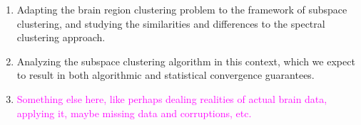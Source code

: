 \documentclass[times,11pt]{article} %
\newcommand{\laura}{\textcolor{magenta}}
\begin{document}
\begin{enumerate}
\item Adapting the brain region clustering problem to the framework of subspace clustering, and studying the similarities and differences to the spectral clustering approach.
\item Analyzing the subspace clustering algorithm in this context, which we expect to result in both algorithmic and statistical convergence guarantees.
\item \laura{Something else here, like perhaps dealing realities of actual brain data, applying it, maybe missing data and corruptions, etc.}
\end{enumerate}



 
%
%


 


\end{document}

